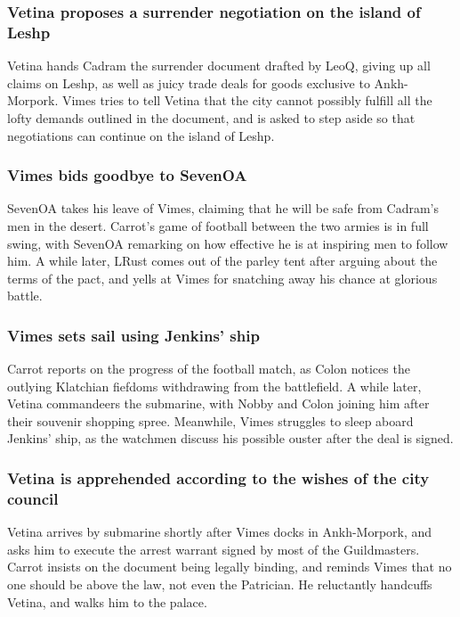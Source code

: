 \subsubsection{\Gls{Vetina} proposes a surrender negotiation on the island of Leshp}
\Gls{Vetina} hands \Gls{Cadram} the surrender document drafted by \Gls{LeoQ}, giving up all claims
on Leshp, as well as juicy trade deals for goods exclusive to Ankh-Morpork. \Gls{Vimes} tries to
tell \Gls{Vetina} that the city cannot possibly fulfill all the lofty demands outlined in the
document, and is asked to step aside so that negotiations can continue on the island of Leshp.

\subsubsection{\Gls{Vimes} bids goodbye to \Gls{SevenOA}}
\Gls{SevenOA} takes his leave of \Gls{Vimes}, claiming that he will be safe from \Gls{Cadram}'s
men in the desert. \Gls{Carrot}'s game of football between the two armies is in full swing, with
\Gls{SevenOA} remarking on how effective he is at inspiring men to follow him. A while later,
\Gls{LRust} comes out of the parley tent after arguing about the terms of the pact, and yells at
\Gls{Vimes} for snatching away his chance at glorious battle.

\subsubsection{\Gls{Vimes} sets sail using \Gls{Jenkins}' ship}
\Gls{Carrot} reports on the progress of the football match, as \Gls{Colon} notices the outlying
Klatchian fiefdoms withdrawing from the battlefield. A while later, \Gls{Vetina} commandeers the
submarine, with \Gls{Nobby} and \Gls{Colon} joining him after their souvenir shopping spree.
Meanwhile, \Gls{Vimes} struggles to sleep aboard \Gls{Jenkins}' ship, as the watchmen discuss his
possible ouster after the deal is signed.

\subsubsection{\Gls{Vetina} is apprehended according to the wishes of the city council}
\Gls{Vetina} arrives by submarine shortly after \Gls{Vimes} docks in Ankh-Morpork, and asks him
to execute the arrest warrant signed by most of the Guildmasters. \Gls{Carrot} insists on the
document being legally binding, and reminds \Gls{Vimes} that no one should be above the law, not
even the Patrician. He reluctantly handcuffs \Gls{Vetina}, and walks him to the palace.

